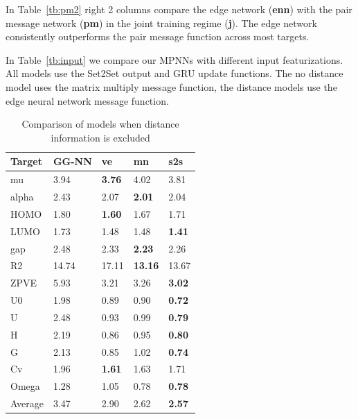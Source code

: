 \documentclass{article}
\begin{document}
In Table~\ref{tb:pm2} right 2 columns compare the edge network (\textbf{enn}) with the pair message network (\textbf{pm}) in the joint training regime (\textbf{j}). The edge network consistently outperforms the pair message function across most targets. 

In Table~\ref{tb:input} we compare our MPNNs with different input featurizations. All models use the Set2Set output and GRU update functions. The no distance model uses the matrix multiply message function, the distance models use the edge neural network message function. 





\begin{table}[t]
\centering
\caption{Comparison of models when distance information is excluded}
\label{tb:spatial2}
\begin{tabular}{lllll}
\hline
Target & GG-NN  & ve  & mn & s2s \\
\hline


mu     & 3.94     & \textbf{3.76}     & 4.02            & 3.81        \\
alpha  & 2.43     & 2.07     & \textbf{2.01}            & 2.04        \\
HOMO   & 1.80     & \textbf{1.60}     & 1.67            & 1.71        \\
LUMO   & 1.73     & 1.48     & 1.48            & \textbf{1.41}        \\
gap    & 2.48     & 2.33     & \textbf{2.23}            & 2.26        \\
R2     & 14.74    & 17.11    & \textbf{13.16}           & 13.67       \\
ZPVE   & 5.93     & 3.21     & 3.26            & \textbf{3.02}        \\
U0     & 1.98     & 0.89     & 0.90            & \textbf{0.72}        \\
U      & 2.48     & 0.93     & 0.99            & \textbf{0.79}        \\
H      & 2.19     & 0.86     & 0.95            & \textbf{0.80}        \\
G      & 2.13     & 0.85     & 1.02            & \textbf{0.74}        \\
Cv     & 1.96     & \textbf{1.61}     & 1.63            & 1.71        \\
Omega  & 1.28     & 1.05     & 0.78            & \textbf{0.78}        \\
\hline
Average & 3.47 & 2.90 & 2.62 & \textbf{2.57}
\end{tabular}
\end{table}
\end{document}
